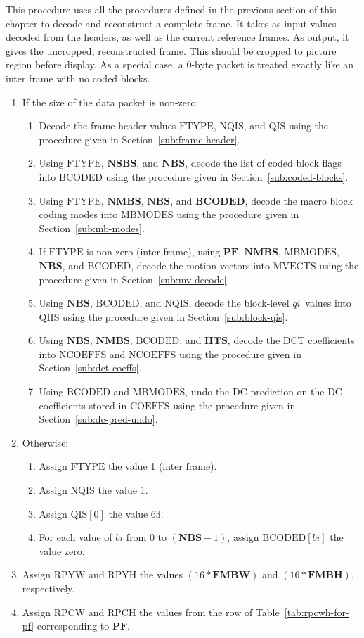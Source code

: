 \documentclass[9pt,letterpaper]{book}
\newcommand{\idx}[1]{{\ensuremath{\mathit{#1}}}}
\newcommand{\qi}{\idx{qi}}
\newcommand{\bi}{\idx{bi}}
\newcommand{\bitvar}[1]{\ensuremath{\mathbf{\bm{#1}}}}
\newcommand{\locvar}[1]{\ensuremath{\mathrm{#1}}}
\numberwithin{equation}{chapter}
\numberwithin{figure}{chapter}
\numberwithin{table}{chapter}
\begin{document}
This procedure uses all the procedures defined in the previous section of this
 chapter to decode and reconstruct a complete frame.
It takes as input values decoded from the headers, as well as the current
 reference frames.
As output, it gives the uncropped, reconstructed frame.
This should be cropped to picture region before display.
As a special case, a 0-byte packet is treated exactly like an inter frame with
 no coded blocks.

\begin{enumerate}
\item
If the size of the data packet is non-zero:
\begin{enumerate}
\item
Decode the frame header values \locvar{FTYPE}, \locvar{NQIS}, and \locvar{QIS}
 using the procedure given in Section~\ref{sub:frame-header}.
\item
Using \locvar{FTYPE}, \bitvar{NSBS}, and \bitvar{NBS}, decode the list of coded
 block flags into \locvar{BCODED} using the procedure given in
 Section~\ref{sub:coded-blocks}.
\item
Using \locvar{FTYPE}, \bitvar{NMBS}, \bitvar{NBS}, and \bitvar{BCODED}, decode
 the macro block coding modes into \locvar{MBMODES} using the procedure given
 in Section~\ref{sub:mb-modes}.
\item
If \locvar{FTYPE} is non-zero (inter frame), using \bitvar{PF}, \bitvar{NMBS},
 \locvar{MBMODES}, \bitvar{NBS}, and \locvar{BCODED}, decode the motion vectors
 into \locvar{MVECTS} using the procedure given in Section~\ref{sub:mv-decode}.
\item
Using \bitvar{NBS}, \locvar{BCODED}, and \locvar{NQIS}, decode the block-level
 \qi\ values into \locvar{QIIS} using the procedure given in
 Section~\ref{sub:block-qis}.
\item
Using \bitvar{NBS}, \bitvar{NMBS}, \locvar{BCODED}, and \bitvar{HTS}, decode
 the DCT coefficients into \locvar{NCOEFFS} and \locvar{NCOEFFS} using the
 procedure given in Section~\ref{sub:dct-coeffs}.
\item
Using \locvar{BCODED} and \locvar{MBMODES}, undo the DC prediction on the DC
 coefficients stored in \locvar{COEFFS} using the procedure given in
 Section~\ref{sub:dc-pred-undo}.
\end{enumerate}
\item
Otherwise:
\begin{enumerate}
\item
Assign \locvar{FTYPE} the value 1 (inter frame).
\item
Assign \locvar{NQIS} the value 1.
\item
Assign $\locvar{QIS}[0]$ the value 63.
\item
For each value of \locvar{\bi} from 0 to $(\bitvar{NBS}-1)$, assign
 $\locvar{BCODED}[\locvar{\bi}]$ the value zero.
\end{enumerate}
\item
Assign \locvar{RPYW} and \locvar{RPYH} the values $(16*\bitvar{FMBW})$ and
 $(16*\bitvar{FMBH})$, respectively.
\item
Assign \locvar{RPCW} and \locvar{RPCH} the values from the row of
 Table~\ref{tab:rpcwh-for-pf} corresponding to \bitvar{PF}.


\end{enumerate}
\end{document}
